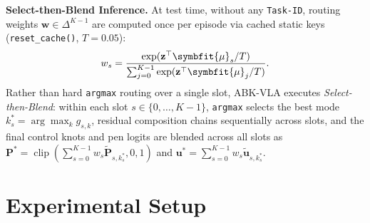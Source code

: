\documentclass[10pt,twocolumn]{article}
\begin{document}
\textbf{Select-then-Blend Inference.} At test time, without any \texttt{Task-ID}, routing weights $\mathbf{w} \in \Delta^{K-1}$ are computed once per episode via cached static keys (\texttt{reset\_cache()}, $T = 0.05$):
\begin{equation}
    w_s = \frac{\exp(\mathbf{z}^\top \symbfit{\mu}_s / T)}{\sum_{j=0}^{K-1} \exp(\mathbf{z}^\top \symbfit{\mu}_j / T)}.
\end{equation}
Rather than hard \texttt{argmax} routing over a single slot, ABK-VLA executes \textit{Select-then-Blend}: within each slot $s \in \{0, \dots, K-1\}$, \texttt{argmax} selects the best mode $k_s^* = \arg\max_k g_{s,k}$, residual composition chains sequentially across slots, and the final control knots and pen logits are blended across all slots as $\mathbf{P}^* = \operatorname{clip}(\sum_{s=0}^{K-1} w_s \tilde{\mathbf{P}}_{s,k_s^*}, 0, 1)$ and $\mathbf{u}^* = \sum_{s=0}^{K-1} w_s \tilde{\mathbf{u}}_{s,k_s^*}$.

\section{Experimental Setup}
\end{document}
